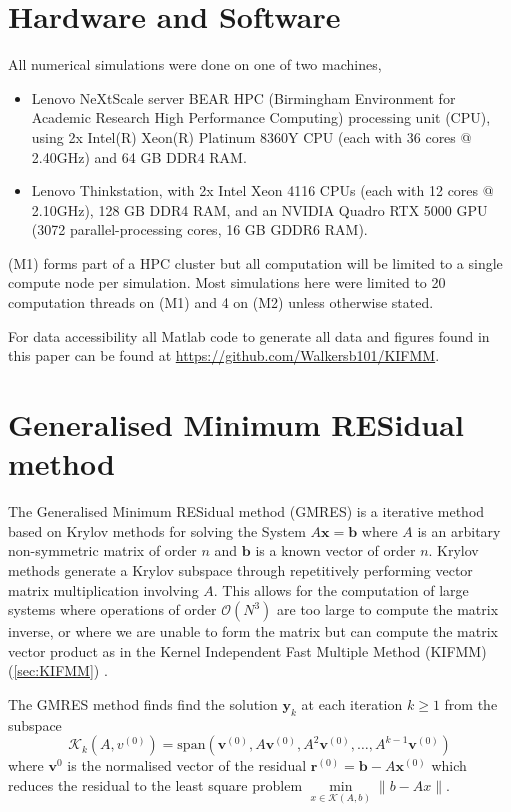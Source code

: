 \appendix
\FloatBarrier
\section{Hardware and Software}\label{appendix:Hardware}
All numerical simulations were done on one of two machines,
\begin{itemize}
    \item [(M1)] Lenovo NeXtScale server BEAR HPC (Birmingham Environment for Academic Research High Performance Computing) processing unit (CPU), using 2x Intel(R) Xeon(R) Platinum 8360Y CPU  (each with 36 cores @ 2.40GHz) and 64 GB DDR4 RAM.
    \item [(M2)] Lenovo Thinkstation, with 2x Intel Xeon 4116 CPUs (each with 12 cores @ 2.10GHz), 128 GB DDR4 RAM, and an NVIDIA Quadro RTX 5000 GPU (3072 parallel-processing cores, 16 GB GDDR6 RAM).
\end{itemize}
(M1) forms part of a HPC cluster but all computation will be limited to a single compute node per simulation. Most simulations here were limited to 20 computation threads on (M1) and 4 on (M2) unless otherwise stated.

For data accessibility all Matlab code to generate all data and figures found in this paper can be found at \url{https://github.com/Walkersb101/KIFMM}.

\FloatBarrier
\section{Generalised Minimum RESidual method}\label{appendix:GMRES}

The Generalised Minimum RESidual method (GMRES) \cite{Saad1986GMRES:Systems} is a iterative method based on Krylov methods for solving the System $A\bm{x}=\bm{b}$ where $A$ is an arbitary non-symmetric matrix of order $n$ and $\bm{b}$ is a known vector of order $n$. Krylov methods generate a Krylov subspace through repetitively performing vector matrix multiplication involving $A$. This allows for the computation of large systems where operations of order $\mathcal{O}(N^3)$ are too large to compute the matrix inverse, or where we are unable to form the matrix but can compute the matrix vector product as in the Kernel Independent Fast Multiple Method (KIFMM) (\cref{sec:KIFMM}) \cite{Ipsen1998TheMethods}.

The GMRES method finds find the solution $\bm{y}_k$ at each iteration $k \geq 1$ from the subspace
\begin{equation*}
    \mathcal{K}_k(A,v^{(0)}) = \text{span}(\bm{v}^{(0)},A\bm{v}^{(0)},A^2\bm{v}^{(0)},\dots,A^{k-1}\bm{v}^{(0)})
\end{equation*}
where $\bm{v}^{0}$ is the normalised vector of the residual $\bm{r}^{(0)}=\bm{b}-A\bm{x}^{(0)}$ which reduces the residual to the least square problem $\min\limits_{x\in\mathcal{K}(A,b)} \lVert b-Ax \rVert$.

